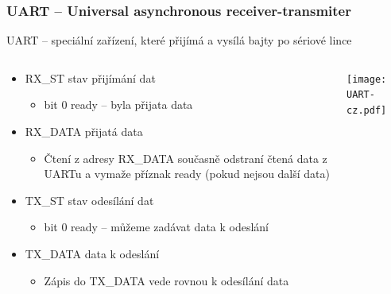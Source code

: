 \documentclass{beamer}
\begin{document}
\begin{frame}
\frametitle{UART -- Universal asynchronous receiver-transmiter}

UART -- speciální zařízení, které přijímá a vysílá bajty po sériové lince

\begin{columns}
\begin{column}{0.55\textwidth}  
\begin{itemize}
\item RX\_ST stav přijímání dat
  \begin{itemize}
  \item bit 0 ready -- byla přijata data
  \end{itemize}
\item RX\_DATA přijatá data
  \begin{itemize}
  \item Čtení z adresy RX\_DATA současně odstraní čtená data z UARTu a vymaže příznak ready (pokud nejsou další data)
  \end{itemize}
\item TX\_ST stav odesílání dat
  \begin{itemize}
  \item bit 0 ready -- můžeme zadávat data k odeslání
  \end{itemize}
\item TX\_DATA data k odeslání
  \begin{itemize}
  \item Zápis do TX\_DATA vede rovnou k odesílání data
  \end{itemize}
\end{itemize}
\end{column}
\begin{column}{0.45\textwidth}
\texttt{[image: UART-cz.pdf]}
\end{column}
\end{columns}

\end{frame}
\end{document}
